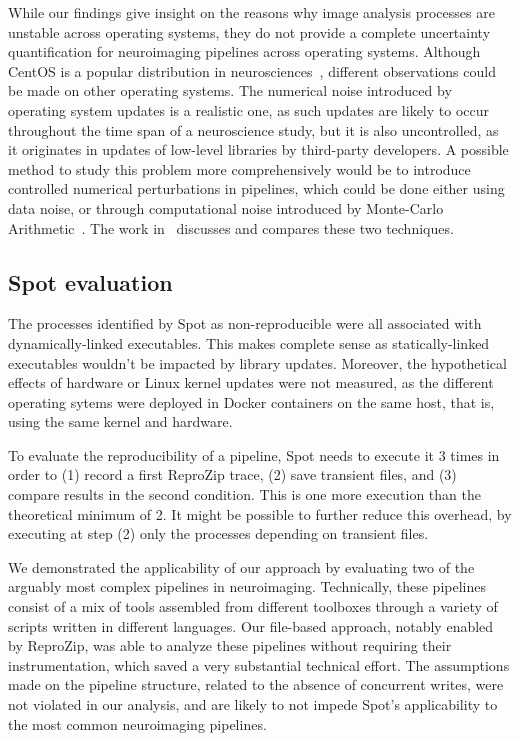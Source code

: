 \documentclass[a4paper,num-refs]{oup-contemporary}
\newcommand{\reprozip}[0]{ReproZip\xspace}
\newcommand{\toolname}[0]{Spot\xspace}
\begin{document}
While our findings give insight on the reasons why image analysis processes
are unstable across operating systems, they do not provide a complete
uncertainty quantification for neuroimaging pipelines across operating
systems. Although CentOS is a popular distribution in
neurosciences~\cite{hanke2011neuroscience}, different observations could be
made on other operating systems. The numerical noise introduced by
operating system updates is a realistic one, as such updates are likely to
occur throughout the time span of a neuroscience study, but it is also
uncontrolled, as it originates in updates of low-level libraries by
third-party developers. A possible method to study this problem more
comprehensively would be to introduce controlled numerical perturbations in
pipelines, which could be done either using data noise, or through
computational noise introduced by Monte-Carlo
Arithmetic~\cite{Parker1997-qq}. The work in~\cite{kiar2019comparing}
discusses and compares these two techniques.

\subsection{\toolname evaluation}

The processes identified by \toolname as non-reproducible were all
associated with dynamically-linked executables. 
This makes complete sense as statically-linked executables wouldn't
be impacted by library updates. Moreover, the hypothetical effects of
hardware or Linux kernel updates were not measured, as the different
operating sytems were deployed in Docker containers on the same host, that
is, using the same kernel and hardware.

To evaluate the reproducibility of a pipeline, \toolname needs to execute
it 3 times in order to (1) record a first \reprozip trace, (2) save
transient files, and (3) compare results in the second condition. This is
one more execution than the theoretical minimum of 2. It might be possible
to further reduce this overhead, by executing at step (2) only the
processes depending on transient files.

We demonstrated the applicability of our approach by evaluating two of the
arguably most complex pipelines in neuroimaging. Technically, these
pipelines consist of a mix of tools assembled from different toolboxes
through a variety of scripts written in different languages. Our file-based
approach, notably enabled by \reprozip, was able to analyze these pipelines
without requiring their instrumentation, which saved a very substantial
technical effort. The assumptions made on the pipeline structure, related
to the absence of concurrent writes, were not violated in our analysis, and
are likely to not impede \toolname's applicability to the most common
neuroimaging pipelines. 
\end{document}
